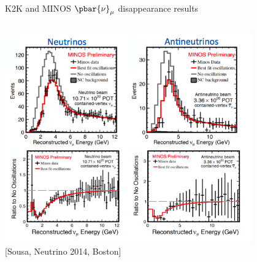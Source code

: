 \begin{frame}[t]{K2K and MINOS $\pbar{\nu}_{\mu}$ disappearance results}
\begin{columns}
\begin{column}{0.59\textwidth}
\begin{itemize}
{    }
    \end{itemize}
    {\centering
      \includegraphics[width=0.80\textwidth]{./images/3nu/accelerator/minos_disapp_spectra.png}\\
      {\scriptsize \color{blue}[Sousa, Neutrino 2014, Boston]}\\
    }
  \end{column}
\end{columns}
\end{frame}


